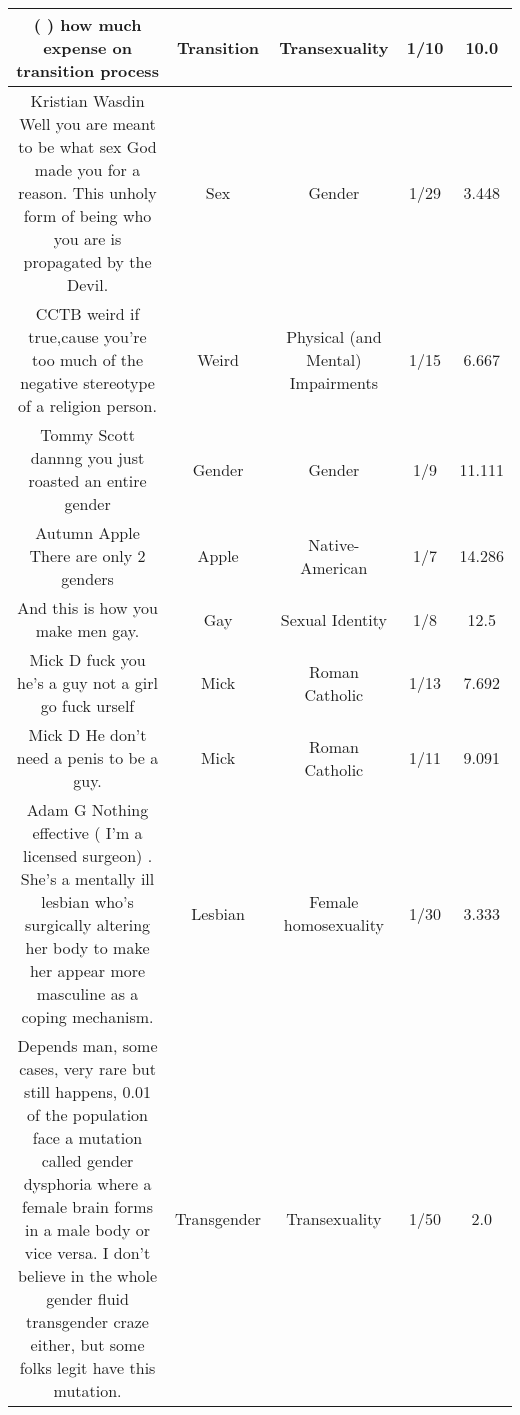 \documentclass[11pt]{article}
\newlength\mylength
\begin{document}
\begin{center}
\begin{longtable}{|C{.40\mylength}|C{.30\mylength}|C{.15\mylength}|C{.15\mylength}|C{.15\mylength}|}
  (         ) how much expense on transition process  & Transition & Transexuality & 1/10 & 10.0 \\  \hline
   Kristian Wasdin Well you are meant to be what sex God made you for a reason. This unholy form of  being who you are  is propagated by the Devil.  & Sex & Gender & 1/29 & 3.448 \\  \hline
   CCTB  weird if true,cause you're too much of the negative stereotype of a religion person.  & Weird & Physical (and Mental) Impairments & 1/15 & 6.667 \\  \hline
   Tommy Scott dannng you just roasted an entire gender  & Gender & Gender & 1/9 & 11.111 \\  \hline
  Autumn Apple There are only 2 genders  & Apple & Native-American & 1/7 & 14.286 \\  \hline
  And this is how you make men gay.  & Gay & Sexual Identity & 1/8 & 12.5 \\  \hline
   Mick D fuck you he's a guy not a girl go fuck urself  & Mick & Roman Catholic & 1/13 & 7.692 \\  \hline
   Mick D He don't need a penis to be a guy.  & Mick & Roman Catholic & 1/11 & 9.091 \\  \hline
  Adam G   Nothing effective ( I'm a licensed surgeon) . She's a mentally ill lesbian who's surgically altering her body to make her appear more masculine as a coping mechanism.  & Lesbian & Female homosexuality & 1/30 & 3.333 \\  \hline
  Depends man, some cases, very rare but still happens, 0.01   of the population face a mutation called gender dysphoria where a female brain forms in a male body or vice versa. I don't believe in the whole gender fluid transgender craze either, but some folks legit have this mutation.  & Transgender & Transexuality & 1/50 & 2.0 \\  \hline

\end{longtable}
\end{center}
\end{document}
